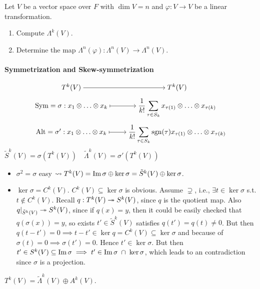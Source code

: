 \begin{exercise}
  Let $V$ be a vector space over $F$ with $\dim V = n$ and $\varphi: V\to V$
  be a linear transformation.
  \begin{enumerate}[(1)]
    \item Compute $\Lambda^k(V)$.
    \item Determine the map $\Lambda^n(\varphi): \Lambda^n(V)\to \Lambda^n(V)$.
  \end{enumerate}
\end{exercise}

\paragraph{Symmetrization and Skew-symmetrization}
\[
  \begin{tikzcd}[cramped, row sep=tiny]
    T^k(V) \arrow[r] & T^k(V) \\
    \Sym = \sigma: x_1\Ot \dots \Ot x_k \arrow[r, mapsto]
    & \displaystyle \frac{1}{k!}\sum_{\tau \in S_k}
    x_{\tau(1)}\Ot \dots \Ot x_{\tau(k)} \\
    \Alt = \sigma': x_1\Ot \dots \Ot x_k \arrow[r, mapsto]
    & \displaystyle \frac{1}{k!}\sum_{\tau \in S_k} \sgn(\tau)
    x_{\tau(1)}\Ot \dots \Ot x_{\tau(k)}
  \end{tikzcd}
\]
$\tilde{S}^k(V) = \sigma(T^k(V)) \quad \tilde{\Lambda}^k(V) = \sigma'(T^k(V))$

\begin{itemize}
  \item $\sigma^2 = \sigma$ easy $\leadsto T^k(V) = \operatorname{Im} \sigma \oplus
    \ker \sigma = \tilde{S}^k(V) \oplus \ker \sigma$.
  \item $\ker \sigma = C^k(V)$.
    $C^k(V) \subseteq \ker \sigma$ is obvious.
    Assume $\supsetneq$, i.e., $\exists t \in \ker \sigma$ s.t.
    $t \not\in C^k(V)$.
    Recall $q: T^k(V) \twoheadrightarrow S^k(V)$, since $q$ is the quotient map. Also 
    $q |_{\tilde{S}^k(V)} \twoheadrightarrow S^k(V)$, since if $q(x) = y$, then it could
    be easily checked that $q(\sigma(x)) = y$, so exists $t' \in \tilde{S}^k(V)$ satisfies
    $q(t') = q(t) \neq 0$. But then $q(t-t') = 0 \implies t-t' \in \ker q = C^k(V) \subseteq
    \ker \sigma$ and because of $\sigma(t) = 0 \implies \sigma(t') = 0$. Hence $t' \in \ker \sigma$.
    But then $t' \in S^k(V) \subseteq \operatorname{Im} \sigma \implies t' \in \operatorname{Im} \sigma \;\cap\;\ker \sigma$,
    which leads to an contradiction since $\sigma$ is a projection.
\end{itemize}

\begin{exercise}
  $T^k(V) = \tilde{\Lambda}^k(V) \oplus A^k(V)$.
\end{exercise}
